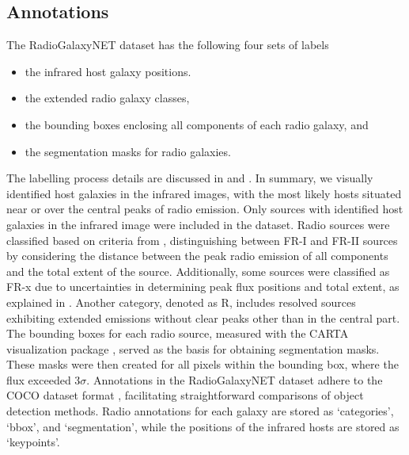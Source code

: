\documentclass[
  journal=pasa,
  manuscript=research-paper, %
  year=2020,
  volume=37,
]{cup-journal}
\begin{document}
\subsection{Annotations}

The RadioGalaxyNET dataset has the following four sets of labels
\begin{itemize}
    \item the infrared host galaxy positions.
    \item the extended radio galaxy classes,
    \item the bounding boxes enclosing all components of each radio galaxy, and
    \item the segmentation masks for radio galaxies.
\end{itemize}

The labelling process details are discussed in \cite{yew22prep} and \cite{gupta2023a}. 
In summary, we visually identified host galaxies in the infrared images, with the most likely hosts situated near or over the central peaks of radio emission. 
Only sources with identified host galaxies in the infrared image were included in the dataset. Radio sources were classified based on criteria from \cite{fanaroff74}, distinguishing between FR-I and FR-II sources by considering the distance between the peak radio emission of all components and the total extent of the source. 
Additionally, some sources were classified as FR-x due to uncertainties in determining peak flux positions and total extent, as explained in \citep{gupta2023a}. 
Another category, denoted as R, includes resolved sources exhibiting extended emissions without clear peaks other than in the central part.
The bounding boxes for each radio source, measured with the CARTA visualization package \citep{comrie21}, served as the basis for obtaining segmentation masks. These masks were then created for all pixels within the bounding box, where the flux exceeded 3$\sigma$.
Annotations in the RadioGalaxyNET dataset adhere to the COCO dataset format \citep{lin14M}, facilitating straightforward comparisons of object detection methods. 
Radio annotations for each galaxy are stored as `categories', `bbox', and `segmentation', while the positions of the infrared hosts are stored as `keypoints'.

\end{document}

